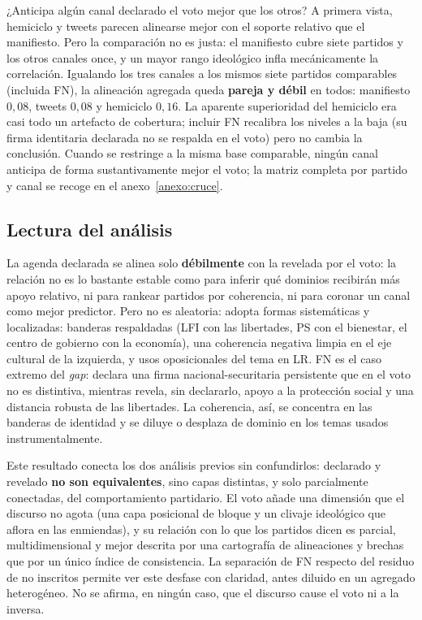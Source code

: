 ¿Anticipa algún canal declarado el voto mejor que los otros? A primera vista,
hemiciclo y tweets parecen alinearse mejor con el soporte relativo que el
manifiesto. Pero la comparación no es justa: el manifiesto cubre siete partidos y
los otros canales once, y un mayor rango ideológico infla mecánicamente la
correlación. Igualando los tres canales a los mismos siete partidos comparables
(incluida FN), la alineación agregada queda \textbf{pareja y débil} en todos:
manifiesto $0{,}08$, tweets $0{,}08$ y hemiciclo $0{,}16$. La aparente
superioridad del hemiciclo era casi todo un artefacto de cobertura; incluir FN
recalibra los niveles a la baja (su firma identitaria declarada no se respalda
en el voto) pero no cambia la conclusión. Cuando se restringe a la misma base
comparable, ningún canal anticipa de forma sustantivamente mejor el voto; la
matriz completa por partido y canal se recoge en el anexo~\ref{anexo:cruce}.

\subsection{Lectura del análisis}
\label{sec:res-cruce-cierre}

La agenda declarada se alinea solo \textbf{débilmente} con la revelada por el
voto: la relación no es lo bastante estable como para inferir qué dominios
recibirán más apoyo relativo, ni para rankear partidos por coherencia, ni para
coronar un canal como mejor predictor. Pero no es aleatoria: adopta formas
sistemáticas y localizadas: banderas respaldadas (LFI con las libertades, PS con
el bienestar, el centro de gobierno con la economía), una coherencia negativa
limpia en el eje cultural de la izquierda, y usos oposicionales del tema en LR.
FN es el caso extremo del \emph{gap}: declara una firma nacional-securitaria
persistente que en el voto no es distintiva, mientras revela, sin declararlo,
apoyo a la protección social y una distancia robusta de las libertades. La
coherencia, así, se concentra en las banderas de identidad y se diluye o desplaza
de dominio en los temas usados instrumentalmente.

Este resultado conecta los dos análisis previos sin confundirlos: declarado y
revelado \textbf{no son equivalentes}, sino capas distintas, y solo
parcialmente conectadas, del comportamiento partidario. El voto añade una
dimensión que el discurso no agota (una capa posicional de bloque y un clivaje
ideológico que aflora en las enmiendas), y su relación con lo que los partidos
dicen es parcial, multidimensional y mejor descrita por una cartografía de
alineaciones y brechas que por un único índice de consistencia. La separación de
FN respecto del residuo de no inscritos permite ver este desfase con claridad,
antes diluido en un agregado heterogéneo. No se afirma, en ningún caso, que el
discurso cause el voto ni a la inversa.
